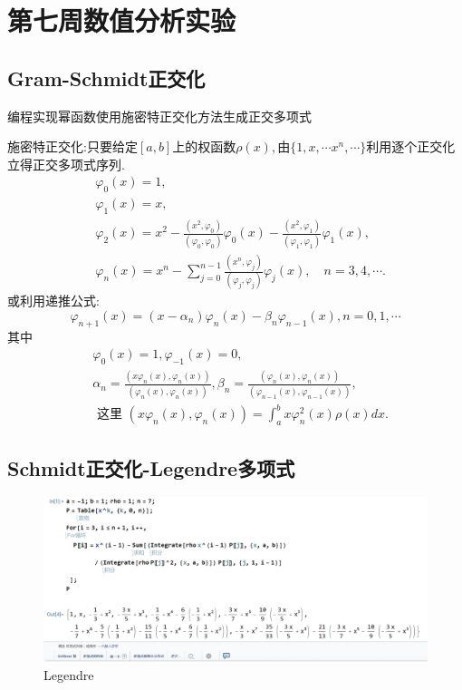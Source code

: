 \section{第七周数值分析实验}
\subsection{Gram-Schmidt正交化}
\begin{ex}
	编程实现幂函数使用施密特正交化方法生成正交多项式
	
	施密特正交化:只要给定$[a,b]$上的权函数$\rho \left( x \right),$由$\{1,x,\cdots x^n,\cdots \}$利用逐个正交化立得正交多项式序列.
	$$
	\begin{aligned}
		& \varphi_0(x)=1, \\
		& \varphi_1(x)=x, \\
		& \varphi_2(x)=x^2-\frac{\left(x^2, \varphi_0\right)}{\left(\varphi_0, \varphi_0\right)} \varphi_0(x)-\frac{\left(x^2, \varphi_1\right)}{\left(\varphi_1, \varphi_1\right)} \varphi_1(x), \\
		& \varphi_n(x)=x^n-\sum_{j=0}^{n-1} \frac{\left(x^n, \varphi_j\right)}{\left(\varphi_j, \varphi_j\right)} \varphi_j(x), \quad n=3,4, \cdots .
	\end{aligned}
	$$
	或利用递推公式:
	$$
	\varphi_{n+1}(x)=\left(x-\alpha_n\right) \varphi_n(x)-\beta_n \varphi_{n-1}(x), n=0,1, \cdots
	$$
	其中
	$$
	\begin{aligned}
		& \varphi_0(x)=1, \varphi_{-1}(x)=0, \\
		& \alpha_n=\frac{\left(x \varphi_n(x), \varphi_n(x)\right)}{\left(\varphi_n(x), \varphi_n(x)\right)}, \beta_n=\frac{\left(\varphi_n(x), \varphi_n(x)\right)}{\left(\varphi_{n-1}(x), \varphi_{n-1}(x)\right)}, \\
		& \text { 这里 }\left(x \varphi_n(x), \varphi_n(x)\right)=\int_a^b x \varphi_n^2(x) \rho(x) d x .
	\end{aligned}
	$$
\end{ex}

\subsection{Schmidt正交化-Legendre多项式}

\begin{figure}[H]
	\centering
	\includegraphics[width = 1\linewidth]{day6/fig1.png}
	\caption{Legendre}
\end{figure}
